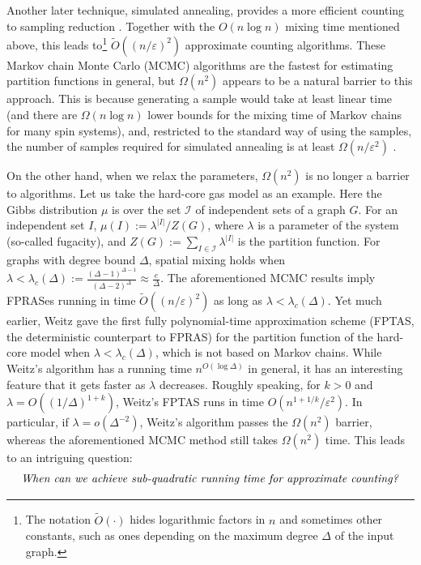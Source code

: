 \documentclass{theoretics}
\def\+#1{\mathcal{#1}}
\newcommand{\abs}[1]{\ensuremath{\left\vert#1\right\vert}}
\newcommand{\eps}{\varepsilon}
\newcommand{\defeq}{:=}
\begin{document}
Another later technique, simulated annealing, provides a more efficient counting to sampling reduction \cite{SVV09,Hub15,Kol18}.
Together with the $O(n\log n)$ mixing time mentioned above, this leads to\footnote{The notation $\widetilde{O}(\cdot)$ hides logarithmic factors in $n$ and sometimes other constants, such as ones depending on the maximum degree $\Delta$ of the input graph.} $\widetilde{O}((n/\eps)^2)$ approximate counting algorithms. %
These Markov chain Monte Carlo (MCMC) algorithms are the fastest for estimating partition functions in general,
but $\Omega(n^2)$ appears to be a natural barrier to this approach.
This is because generating a sample would take at least linear time (and there are $\Omega(n\log n)$ lower bounds for the mixing time of Markov chains \cite{HS07} for many spin systems),
and, restricted to the standard way of using the samples, the number of samples required for simulated annealing is at least $\Omega(n/\eps^2)$ \cite[Theorem~10]{Kol18}.

On the other hand, when we relax the parameters, $\Omega(n^2)$ is no longer a barrier to algorithms.
Let us take the hard-core gas model as an example. 
Here the Gibbs distribution $\mu$ is over the set $\+I$ of independent sets of a graph $G$.
For an independent set $I$, $\mu(I)\defeq\lambda^{\abs{I}}/Z(G)$, where $\lambda$ is a parameter of the system (so-called fugacity),
and $Z(G)\defeq\sum_{I\in\+I} \lambda^{\abs{I}}$ is the partition function.
For graphs with degree bound $\Delta$, spatial mixing holds when $\lambda<\lambda_c(\Delta) \defeq \frac{(\Delta-1)^{\Delta-1}}{(\Delta-2)^{\Delta}} \approx\frac{e}{\Delta}$.
The aforementioned MCMC results \cite{CLV21,CFYZ22,CE22} imply FPRASes running in time $\widetilde{O}((n/\varepsilon)^2)$ as long as $\lambda<\lambda_c(\Delta)$. 
Yet much earlier, Weitz \cite{Wei06} gave the first fully polynomial-time approximation scheme (FPTAS, the deterministic counterpart to FPRAS) for the partition function of the hard-core model when $\lambda<\lambda_c(\Delta)$, which is not based on Markov chains.
While Weitz's algorithm has a running time $n^{O(\log \Delta)}$ in general,
it has an interesting feature that it gets faster as $\lambda$ decreases. 
Roughly speaking, for $k>0$ and $\lambda=O((1/\Delta)^{1+k})$,
Weitz's FPTAS runs in time $O(n^{1+1/k}/\eps^2)$.
In particular, if $\lambda=o(\Delta^{-2})$, Weitz's algorithm passes the $\Omega(n^2)$ barrier,
whereas the aforementioned MCMC method still takes $\Omega(n^2)$ time.
This leads to an intriguing question:
\begin{align}\label{question}
  \text{\emph{When can we achieve sub-quadratic running time for approximate counting?}}
\end{align}
\end{document}
